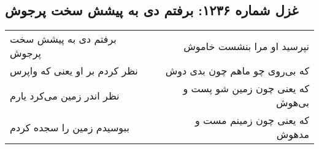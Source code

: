 \begin{center}
\section*{غزل شماره ۱۲۳۶: برفتم دی به پیشش سخت پرجوش}
\label{sec:1236}
\begin{longtable}{l p{0.5cm} r}
برفتم دی به پیشش سخت پرجوش
&&
نپرسید او مرا بنشست خاموش
\\
نظر کردم بر او یعنی که واپرس
&&
که بی‌روی چو ماهم چون بدی دوش
\\
نظر اندر زمین می‌کرد یارم
&&
که یعنی چون زمین شو پست و بی‌هوش
\\
ببوسیدم زمین را سجده کردم
&&
که یعنی چون زمینم مست و مدهوش
\\
\end{longtable}
\end{center}
